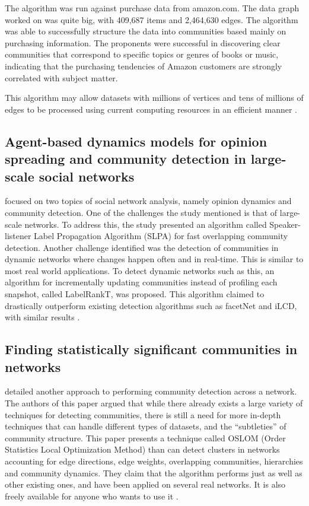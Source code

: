 The algorithm was run against purchase data from amazon.com. The data graph worked on was quite big, with 409,687 items and 2,464,630 edges. The algorithm was able to successfully structure the data into communities based mainly on purchasing information. The proponents were successful in discovering clear communities that correspond to specific topics or genres of books or music, indicating that the purchasing tendencies of Amazon customers are strongly correlated with subject matter.


This algorithm may allow datasets with millions of vertices and tens of millions of edges to be processed using current computing resources in an efficient manner \cite{Clauset:2004}.


\subsection{Agent-based dynamics models for opinion spreading and community detection in large-scale social networks}


 focused on two topics of social network analysis, namely opinion dynamics and community detection. One of the challenges the study mentioned is that of large-scale networks. To address this, the study presented an algorithm called Speaker-listener Label Propagation Algorithm (SLPA) for fast overlapping community detection. Another challenge identified was the detection of communities in dynamic networks where changes happen often and in real-time. This is similar to most real world applications. To detect dynamic networks such as this, an algorithm for incrementally updating communities instead of profiling each snapshot, called LabelRankT, was proposed. This algorithm claimed to drastically outperform existing detection algorithms such as facetNet and iLCD, with similar results \cite{Xie:2012}. 


\subsection{Finding statistically significant communities in networks}


 detailed another approach to performing community detection across a network. The authors of this paper argued that while there already exists a large variety of techniques for detecting communities, there is still a need for more in-depth techniques that can handle different types of datasets, and the ``subtleties'' of community structure. This paper presents a technique called OSLOM (Order Statistics Local Optimization Method) than can detect clusters in networks accounting for edge directions, edge weights, overlapping communities, hierarchies and community dynamics. They claim that the algorithm performs just as well as other existing ones, and have been applied on several real networks. It is also freely available for anyone who wants to use it \cite{Lancichinetti:2011}.


